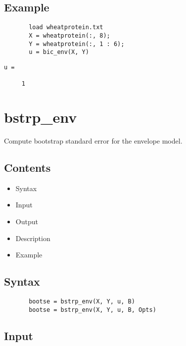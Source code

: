 \documentclass[a4paper,11pt,openany]{memoir}
\begin{document}
\subsection*{Example}


\begin{verbatim}       load wheatprotein.txt
       X = wheatprotein(:, 8);
       Y = wheatprotein(:, 1 : 6);
       u = bic_env(X, Y)\end{verbatim}
    
        \color{lightgray}\ttfamily \begin{verbatim}
u =

     1

\end{verbatim} \rmfamily
\color{black}
 
 
 \newpage

\rmfamily
\color{black}\section{bstrp\_env}

\begin{par}
Compute bootstrap standard error for the envelope model.
\end{par} \vspace{1em}

\subsection*{Contents}

\begin{itemize}
\setlength{\itemsep}{-1ex}
   \item Syntax
   \item Input
   \item Output
   \item Description
   \item Example
\end{itemize}


\subsection*{Syntax}


\begin{verbatim}       bootse = bstrp_env(X, Y, u, B)
       bootse = bstrp_env(X, Y, u, B, Opts)\end{verbatim}
    

\subsection*{Input}
\end{document}
